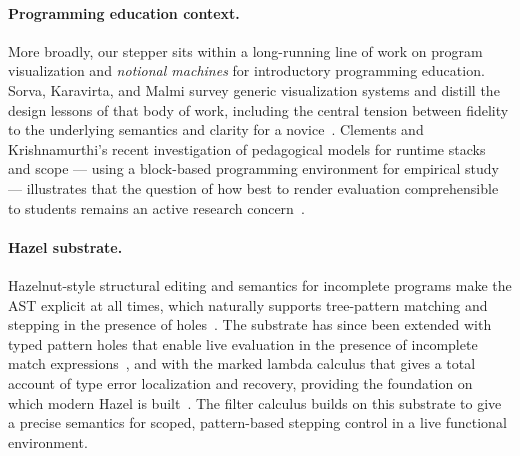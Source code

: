 \paragraph*{Programming education context.}
More broadly, our stepper sits within a long-running line of work on program
visualization and \emph{notional machines} for introductory programming
education. Sorva, Karavirta, and Malmi survey generic visualization systems
and distill the design lessons of that body of work, including the central
tension between fidelity to the underlying semantics and clarity for a
novice~\cite{sorva2013review}. Clements and Krishnamurthi's recent
investigation of pedagogical models for runtime stacks and scope --- using a
block-based programming environment for empirical study --- illustrates that
the question of how best to render evaluation comprehensible to students
remains an active research concern~\cite{clements2022notional}.

\paragraph*{Hazel substrate.}
Hazelnut-style structural editing and semantics for incomplete programs make
the AST explicit at all times, which naturally supports tree-pattern matching
and stepping in the presence of holes~\cite{omar2017hazelnut,omar2019live}.
The substrate has since been extended with typed pattern holes that enable
live evaluation in the presence of incomplete match
expressions~\cite{yuan2023peanut}, and with the marked lambda calculus that
gives a total account of type error localization and recovery, providing the
foundation on which modern Hazel is built~\cite{zhao2024marking}. The filter
calculus builds on this substrate to give a precise semantics for scoped,
pattern-based stepping control in a live functional environment.
